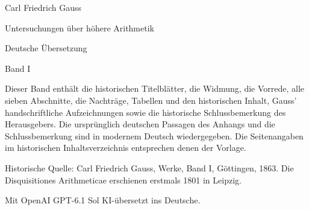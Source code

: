 \begin{titlepage}
\centering
\vspace*{1cm}
{\Large Carl Friedrich Gauss\par}
\bigskip
{\huge Untersuchungen über höhere Arithmetik\par}
\bigskip
{\Large Deutsche Übersetzung\par}
\medskip
{\large Band I\par}
\vfill
\begin{minipage}{0.90\linewidth}
\small
Dieser Band enthält die historischen Titelblätter, die Widmung, die Vorrede, alle sieben Abschnitte, die Nachträge, Tabellen und den historischen Inhalt, Gauss’ handschriftliche Aufzeichnungen sowie die historische Schlussbemerkung des Herausgebers. Die ursprünglich deutschen Passagen des Anhangs und die Schlussbemerkung sind in modernem Deutsch wiedergegeben. Die Seitenangaben im historischen Inhaltsverzeichnis entsprechen denen der Vorlage.

Historische Quelle: Carl Friedrich Gauss, Werke, Band I, Göttingen, 1863. Die Disquisitiones Arithmeticae erschienen erstmals 1801 in Leipzig.

Mit OpenAI GPT-6.1 Sol KI-übersetzt ins Deutsche.
\end{minipage}
\end{titlepage}
